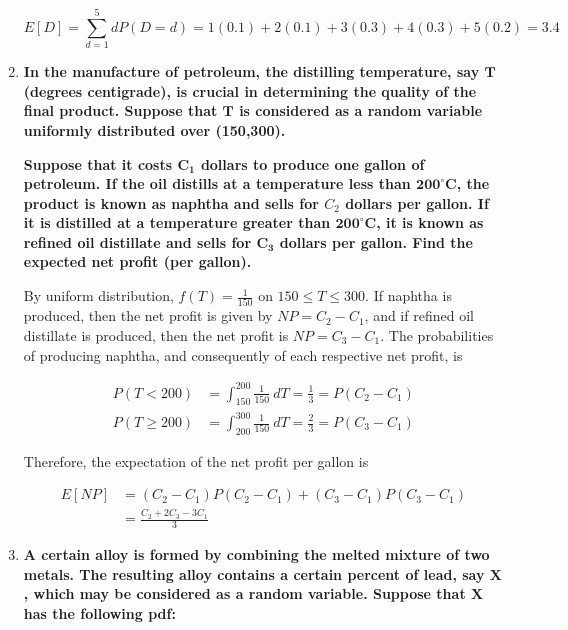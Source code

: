 \documentclass[10pt, oneside]{article}   	%
\theoremstyle{definition}
\begin{document}
\begin{enumerate}[label=7.\arabic*]
\[ E[D] = \sum^5_{d=1} d P(D = d) = 1(0.1) + 2(0.1) + 3(0.3) + 4(0.3) + 5(0.2) = \boxed{3.4} \]

\item  \begin{tcolorbox}[
  colback=Cerulean!5!white,
  colframe=Cerulean!75!black]
\textbf{In the manufacture of petroleum, the distilling temperature, say $\bm{T}$ (degrees centigrade), is crucial in determining the quality of the final product. Suppose that $\bm{T}$ is considered as a random variable uniformly distributed over (150,300).}

\textbf{Suppose that it costs $\bm{C_1}$ dollars to produce one gallon of petroleum. If the oil distills at a temperature less than $\bm{200^\circ}$C, the product is known as naphtha and sells for $C_2$ dollars per gallon. If it is distilled at a temperature greater than $\bm{200^\circ}$C, it is known as refined oil distillate and sells for $\bm{C_3}$ dollars per gallon. Find the expected net profit (per gallon).}
\end{tcolorbox}

By uniform distribution, $f(T) = \frac{1}{150}$ on $150 \leq T \leq 300$. If naphtha is produced, then the net profit is given by $NP = C_2 - C_1$, and if refined oil distillate is produced, then the net profit is $NP = C_3 - C_1$. The probabilities of producing naphtha, and consequently of each respective net profit, is

\begin{align*}
P(T < 200) &= \int^{200}_{150} \frac{1}{150} \ dT = \frac{1}{3} = P(C_2 - C_1) \\
P(T \geq 200) &= \int^{300}_{200} \frac{1}{150} \ dT = \frac{2}{3} = P(C_3 - C_1) 
\end{align*}

Therefore, the expectation of the net profit per gallon is

\begin{align*}
E[NP] &= (C_2 - C_1) P(C_2 - C_1) + (C_3 - C_1) P(C_3 - C_1) \\
&= \boxed{\frac{C_2 + 2 C_3 - 3 C_1}{3}}
\end{align*}

\item  \begin{tcolorbox}[
  colback=Cerulean!5!white,
  colframe=Cerulean!75!black]
\textbf{A certain alloy is formed by combining the melted mixture of two metals. The resulting alloy contains a certain percent of lead, say $\bm{X}$, which may be considered as a random variable. Suppose that $\bm{X}$ has the following pdf:}


\end{tcolorbox}
\end{enumerate}
\end{document}
